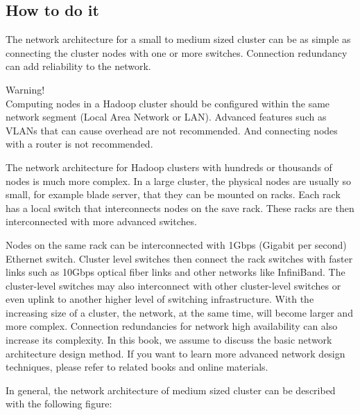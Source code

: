 \subsection*{How to do it}
The network architecture for a small to medium sized cluster can be as simple as connecting the cluster nodes with one or more switches. Connection redundancy can add reliability to the network.
\begin{warning}
Warning! \\
Computing nodes in a Hadoop cluster should be configured within the same network segment (Local Area Network or LAN). Advanced features such as VLANs that can cause overhead are not recommended. And connecting nodes with a router is not recommended.
\end{warning}
The network architecture for Hadoop clusters with hundreds or thousands of nodes is much more complex. In a large cluster, the physical nodes are usually so small, for example blade server, that they can be mounted on racks. Each rack has a local switch that interconnects nodes on the save rack. These racks are then interconnected with more advanced switches.

Nodes on the same rack can be interconnected with 1Gbps (Gigabit per second) Ethernet switch. Cluster level switches then connect the rack switches with faster links such as 10Gbps optical fiber links and other networks like InfiniBand. The cluster-level switches may also interconnect with other cluster-level switches or even uplink to another higher level of switching infrastructure. With the increasing size of a cluster, the network, at the same time, will become larger and more complex. Connection redundancies for network high availability can also increase its complexity. In this book, we assume to discuss the basic network architecture design method. If you want to learn more advanced network design techniques, please refer to related books and online materials.

In general, the network architecture of medium sized cluster can be described with the following figure:

